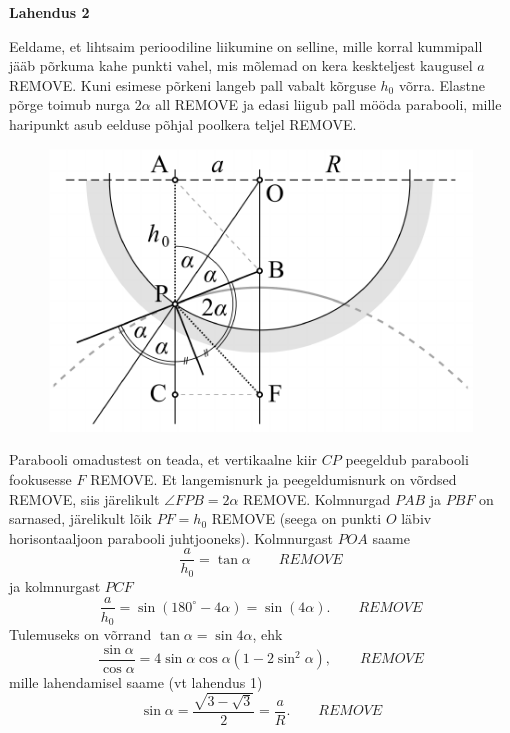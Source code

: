 \documentclass[10pt]{article}
\newcommand{\p}[1]{REMOVE}
\begin{document}
\textbf{Lahendus 2}

Eeldame, et lihtsaim perioodiline liikumine on selline, mille korral kummipall jääb põrkuma kahe punkti vahel, mis mõlemad on kera keskteljest kaugusel $a$ \p{1}. Kuni esimese põrkeni langeb pall vabalt kõrguse $h_0$ võrra. Elastne põrge toimub nurga $2\alpha$ all \p{1} ja edasi liigub pall mööda parabooli, mille haripunkt asub eelduse põhjal poolkera teljel \p{1}.

\begin{figure}
\vspace{-1.1cm}
  \begin{center}
    \includegraphics[width=1\linewidth]{2024-v2g-10-yl2.pdf}
  \end{center}
  \vspace{-0.5cm}
\end{figure}

Parabooli omadustest on teada, et vertikaalne kiir $CP$ peegeldub parabooli fookusesse $F$ \p{2}. Et langemisnurk ja peegeldumisnurk on võrdsed \p{1}, siis järelikult $\angle{FPB}=2\alpha$ \p{1}. Kolmnurgad $PAB$ ja $PBF$ on sarnased, järelikult lõik $PF=h_0$ \p{1} (seega on punkti $O$ läbiv horisontaaljoon parabooli juhtjooneks). Kolmnurgast $POA$ saame
\[\frac{a}{h_0}=\tan\alpha\qquad \p{1}\]
ja kolmnurgast $PCF$
\[\frac{a}{h_0}=\sin(180^\circ-4\alpha)=\sin(4\alpha). \qquad \p{1}\]
Tulemuseks on võrrand $\tan\alpha=\sin 4\alpha$, ehk
\[\frac{\sin\alpha}{\cos\alpha}=4\sin\alpha\cos\alpha(1-2\sin^2\alpha), \qquad \p{1}\]
mille lahendamisel saame (vt lahendus 1)
\[\sin\alpha=\frac{\sqrt{3-\sqrt{3}}}{2}=\frac{a}{R}. \qquad \p{3}\]
\probend
\bigskip

\end{document}
